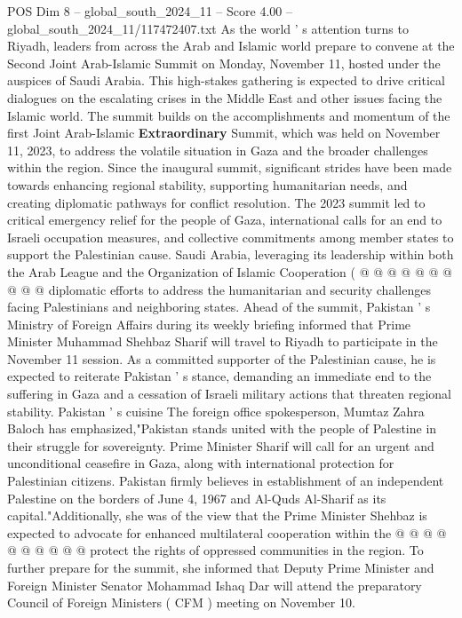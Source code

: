 \begin{textsample}{POS Dim 8 – global\_south\_2024\_11 – Score 4.00 – global\_south\_2024\_11/117472407.txt}  \label{ex:f8_pos_155}
As the world ' s attention turns to Riyadh, leaders from across the Arab and Islamic world prepare to convene at the Second Joint Arab-Islamic Summit on Monday, November 11, hosted under the auspices of Saudi Arabia.
This high-stakes gathering is expected to drive critical dialogues on the escalating crises in the Middle East and other issues facing the Islamic world.
The summit builds on the accomplishments and momentum of the first Joint Arab-Islamic \textbf{Extraordinary} Summit, which was held on November 11, 2023, to address the volatile situation in Gaza and the broader challenges within the region.
Since the inaugural summit, significant strides have been made towards enhancing regional stability, supporting humanitarian needs, and creating diplomatic pathways for conflict resolution.
The 2023 summit led to critical emergency relief for the people of Gaza, international calls for an end to Israeli occupation measures, and collective commitments among member states to support the Palestinian cause.
Saudi Arabia, leveraging its leadership within both the Arab League and the Organization of Islamic Cooperation ( @ @ @ @ @ @ @ @ @ @ diplomatic efforts to address the humanitarian and security challenges facing Palestinians and neighboring states.
Ahead of the summit, Pakistan ' s Ministry of Foreign Affairs during its weekly briefing informed that Prime Minister Muhammad Shehbaz Sharif will travel to Riyadh to participate in the November 11 session.
As a committed supporter of the Palestinian cause, he is expected to reiterate Pakistan ' s stance, demanding an immediate end to the suffering in Gaza and a cessation of Israeli military actions that threaten regional stability.
Pakistan ' s cuisine The foreign office spokesperson, Mumtaz Zahra Baloch has emphasized,"Pakistan stands united with the people of Palestine in their struggle for sovereignty.
Prime Minister Sharif will call for an urgent and unconditional ceasefire in Gaza, along with international protection for Palestinian citizens.
Pakistan firmly believes in establishment of an independent Palestine on the borders of June 4, 1967 and Al-Quds Al-Sharif as its capital."Additionally, she was of the view that the Prime Minister Shehbaz is expected to advocate for enhanced multilateral cooperation within the @ @ @ @ @ @ @ @ @ @ protect the rights of oppressed communities in the region.
To further prepare for the summit, she informed that Deputy Prime Minister and Foreign Minister Senator Mohammad Ishaq Dar will attend the preparatory Council of Foreign Ministers ( CFM ) meeting on November 10.

\end{textsample}
